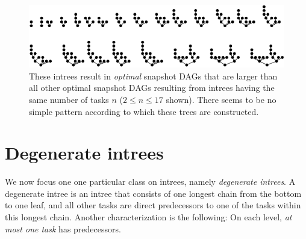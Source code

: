 \begin{figure}[t]
  \centering
  \includegraphics[scale=1.4]{p3/max_snapshot_dag.pdf}
  \caption{These intrees result in \emph{optimal} snapshot DAGs that are larger than all other optimal snapshot DAGs resulting from intrees having the same number of tasks $n$ ($2 \leq n \leq 17$ shown). There seems to be no simple pattern according to which these trees are constructed.}
  \label{fig:intrees-maximum-snapshot-dag-size-p3}
\end{figure}




\section{Degenerate intrees}
\label{sec:p3-degenerate-intrees}

We now focus one one particular class on intrees, namely \emph{degenerate intrees}. A degenerate intree is an intree that consists of one longest chain from the bottom to one leaf, and all other tasks are direct predecessors to one of the tasks within this longest chain. Another characterization is the following: On each level, \emph{at most one task} has predecessors.

